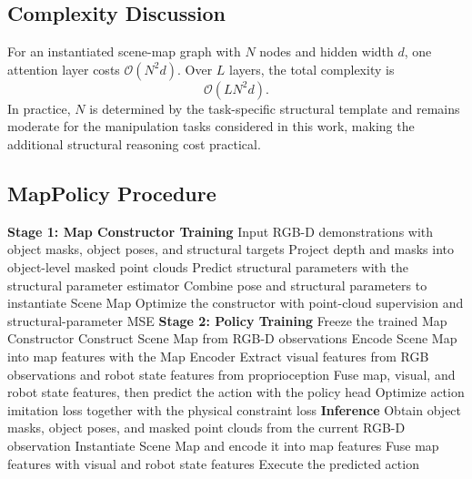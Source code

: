 
\subsection{Complexity Discussion}
\label{app:complexity}
For an instantiated scene-map graph with $N$ nodes and hidden width $d$, one attention layer costs $\mathcal{O}(N^2 d)$. Over $L$ layers, the total complexity is
\begin{equation}
\mathcal{O}(L N^2 d).
\end{equation}
In practice, $N$ is determined by the task-specific structural template and remains moderate for the manipulation tasks considered in this work, making the additional structural reasoning cost practical.

\subsection{MapPolicy Procedure}
\label{app:mappolicy_procedure}

\begin{algorithm}[t]
\caption{MapPolicy training and inference pipeline}
\label{alg:mappolicy_procedure}
\small
\begin{algorithmic}[1]
\State \textbf{Stage 1: Map Constructor Training}
\State Input RGB-D demonstrations with object masks, object poses, and structural targets
\State Project depth and masks into object-level masked point clouds
\State Predict structural parameters with the structural parameter estimator
\State Combine pose and structural parameters to instantiate Scene Map
\State Optimize the constructor with point-cloud supervision and structural-parameter MSE
\State \textbf{Stage 2: Policy Training}
\State Freeze the trained Map Constructor
    \State Construct Scene Map from RGB-D observations
    \State Encode Scene Map into map features with the Map Encoder
    \State Extract visual features from RGB observations and robot state features from proprioception
    \State Fuse map, visual, and robot state features, then predict the action with the policy head
    \State Optimize action imitation loss together with the physical constraint loss
\EndFor
\State \textbf{Inference}
    \State Obtain object masks, object poses, and masked point clouds from the current RGB-D observation
    \State Instantiate Scene Map and encode it into map features
    \State Fuse map features with visual and robot state features
    \State Execute the predicted action
\EndWhile
\end{algorithmic}
\end{algorithm}

